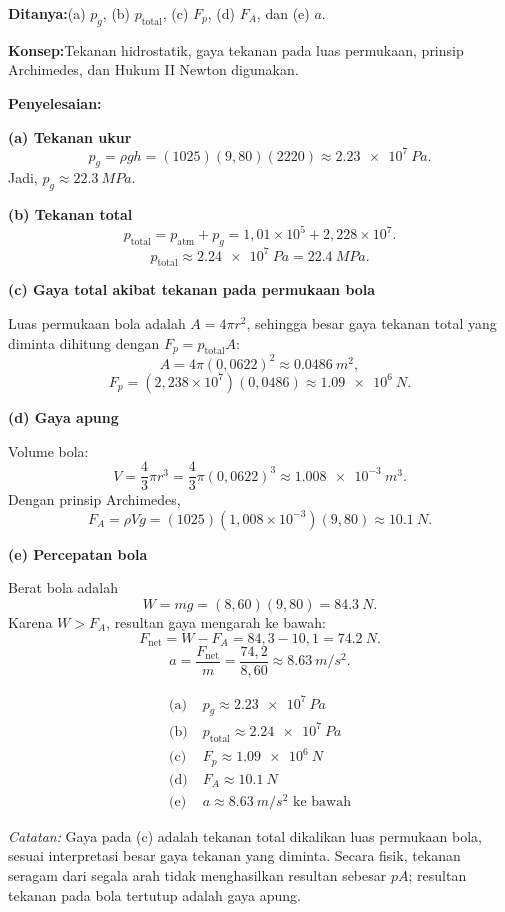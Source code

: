 \documentclass[12pt,a4paper]{article}
\newcommand{\ditanya}{\par\medskip\noindent\textbf{Ditanya:}}
\newcommand{\konsep}{\par\medskip\noindent\textbf{Konsep:}}
\newcommand{\penyelesaian}{\par\medskip\noindent\textbf{Penyelesaian:}\par\nopagebreak}
\begin{document}
\ditanya (a) $p_g$, (b) $p_{\mathrm{total}}$, (c) $F_p$, (d) $F_A$, dan (e) $a$.

\konsep Tekanan hidrostatik, gaya tekanan pada luas permukaan, prinsip Archimedes, dan Hukum II Newton digunakan.

\penyelesaian

\textbf{(a) Tekanan ukur}
\[
p_g=\rho gh
=(1025)(9{,}80)(2220)
\approx \SI{2,23e7}{Pa}.
\]
Jadi, $p_g\approx\SI{22,3}{MPa}$.

\textbf{(b) Tekanan total}
\[
p_{\mathrm{total}}=p_{\mathrm{atm}}+p_g
=1{,}01\times10^5+2{,}228\times10^7.
\]
\[
p_{\mathrm{total}}\approx\SI{2,24e7}{Pa}
=\SI{22,4}{MPa}.
\]

\textbf{(c) Gaya total akibat tekanan pada permukaan bola}

Luas permukaan bola adalah $A=4\pi r^2$, sehingga besar gaya tekanan total yang diminta dihitung dengan $F_p=p_{\mathrm{total}}A$:
\[
A=4\pi(0{,}0622)^2\approx\SI{0,0486}{m^2},
\]
\[
F_p=(2{,}238\times10^7)(0{,}0486)
\approx\SI{1,09e6}{N}.
\]

\textbf{(d) Gaya apung}

Volume bola:
\[
V=\frac{4}{3}\pi r^3
=\frac{4}{3}\pi(0{,}0622)^3
\approx\SI{1,008e-3}{m^3}.
\]
Dengan prinsip Archimedes,
\[
F_A=\rho Vg
=(1025)(1{,}008\times10^{-3})(9{,}80)
\approx\SI{10,1}{N}.
\]

\textbf{(e) Percepatan bola}

Berat bola adalah
\[
W=mg=(8{,}60)(9{,}80)=\SI{84,3}{N}.
\]
Karena $W>F_A$, resultan gaya mengarah ke bawah:
\[
F_{\mathrm{net}}=W-F_A=84{,}3-10{,}1=\SI{74,2}{N}.
\]
\[
a=\frac{F_{\mathrm{net}}}{m}
=\frac{74{,}2}{8{,}60}
\approx\SI{8,63}{m/s^2}.
\]

\begin{jawaban}
\[
\boxed{\begin{aligned}
\text{(a)}\;&p_g\approx\SI{2,23e7}{Pa}\\
\text{(b)}\;&p_{\mathrm{total}}\approx\SI{2,24e7}{Pa}\\
\text{(c)}\;&F_p\approx\SI{1,09e6}{N}\\
\text{(d)}\;&F_A\approx\SI{10,1}{N}\\
\text{(e)}\;&a\approx\SI{8,63}{m/s^2}\text{ ke bawah}
\end{aligned}}
\]
\end{jawaban}

\textit{Catatan:} Gaya pada (c) adalah tekanan total dikalikan luas permukaan bola, sesuai interpretasi besar gaya tekanan yang diminta. Secara fisik, tekanan seragam dari segala arah tidak menghasilkan resultan sebesar $pA$; resultan tekanan pada bola tertutup adalah gaya apung.
\end{document}
